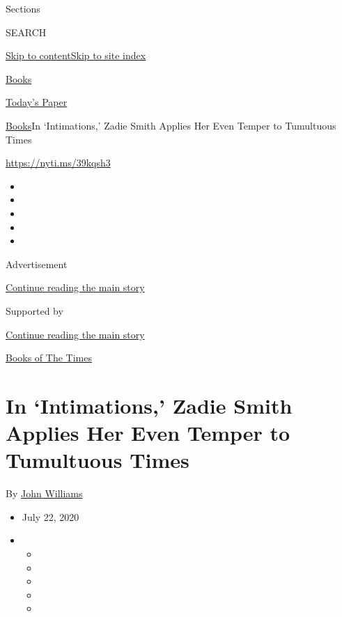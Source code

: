 Sections

SEARCH

\protect\hyperlink{site-content}{Skip to
content}\protect\hyperlink{site-index}{Skip to site index}

\href{https://www.nytimes3xbfgragh.onion/section/books}{Books}

\href{https://myaccount.nytimes3xbfgragh.onion/auth/login?response_type=cookie\&client_id=vi}{}

\href{https://www.nytimes3xbfgragh.onion/section/todayspaper}{Today's
Paper}

\href{/section/books}{Books}\textbar{}In `Intimations,' Zadie Smith
Applies Her Even Temper to Tumultuous Times

\url{https://nyti.ms/39kqsh3}

\begin{itemize}
\item
\item
\item
\item
\item
\end{itemize}

Advertisement

\protect\hyperlink{after-top}{Continue reading the main story}

Supported by

\protect\hyperlink{after-sponsor}{Continue reading the main story}

\href{/column/books-of-the-times}{Books of The Times}

\hypertarget{in-intimations-zadie-smith-applies-her-even-temper-to-tumultuous-times}{%
\section{In `Intimations,' Zadie Smith Applies Her Even Temper to
Tumultuous
Times}\label{in-intimations-zadie-smith-applies-her-even-temper-to-tumultuous-times}}

By \href{https://www.nytimes3xbfgragh.onion/by/john-williams}{John
Williams}

\begin{itemize}
\item
  July 22, 2020
\item
  \begin{itemize}
  \item
  \item
  \item
  \item
  \item
  \end{itemize}
\end{itemize}

